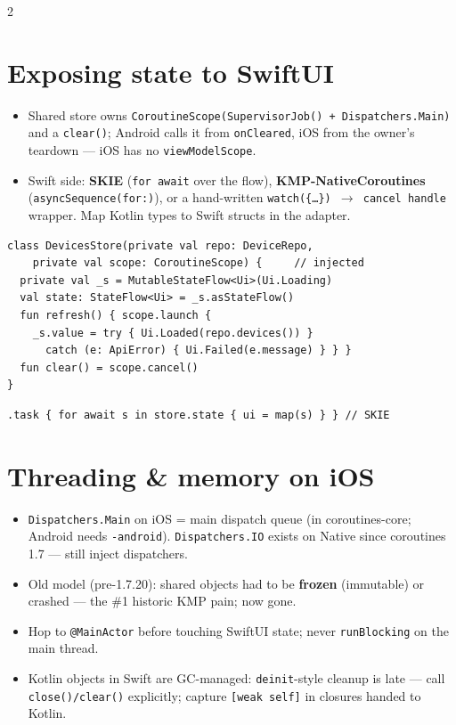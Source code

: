 \documentclass[8pt]{extarticle}
\begin{document}
\begin{multicols}{2}
\section{Exposing state to SwiftUI}
\begin{itemize}\raggedright
  \item Shared store owns \texttt{CoroutineScope(SupervisorJob() + Dispatchers.Main)} and a
        \texttt{clear()}; Android calls it from \texttt{onCleared}, iOS from the owner's
        teardown — iOS has no \texttt{viewModelScope}.
  \item Swift side: \textbf{SKIE} (\texttt{for await} over the flow), \textbf{KMP-NativeCoroutines}
        (\texttt{asyncSequence(for:)}), or a hand-written \texttt{watch(\{…\}) $\to$ cancel handle}
        wrapper. Map Kotlin types to Swift structs in the adapter.
\end{itemize}
\begin{lstlisting}[language=KotlinSheet]
class DevicesStore(private val repo: DeviceRepo,
    private val scope: CoroutineScope) {     // injected
  private val _s = MutableStateFlow<Ui>(Ui.Loading)
  val state: StateFlow<Ui> = _s.asStateFlow()
  fun refresh() { scope.launch {
    _s.value = try { Ui.Loaded(repo.devices()) }
      catch (e: ApiError) { Ui.Failed(e.message) } } }
  fun clear() = scope.cancel()
}
\end{lstlisting}
\vspace{-3pt}
\begin{lstlisting}[language=SwiftSheet]
.task { for await s in store.state { ui = map(s) } } // SKIE
\end{lstlisting}

\section{Threading \& memory on iOS}
\begin{itemize}\raggedright
  \item \texttt{Dispatchers.Main} on iOS = main dispatch queue (in coroutines-core; Android
        needs \texttt{-android}). \texttt{Dispatchers.IO} exists on Native since coroutines
        1.7 — still inject dispatchers.
  \item Old model (pre-1.7.20): shared objects had to be \textbf{frozen} (immutable) or
        crashed — the \#1 historic KMP pain; now gone.
  \item Hop to \texttt{@MainActor} before touching SwiftUI state; never
        \texttt{runBlocking} on the main thread.
  \item Kotlin objects in Swift are GC-managed: \texttt{deinit}-style cleanup is late —
        call \texttt{close()/clear()} explicitly; capture \texttt{[weak self]} in closures
        handed to Kotlin.
\end{itemize}


\end{multicols}
\end{document}
